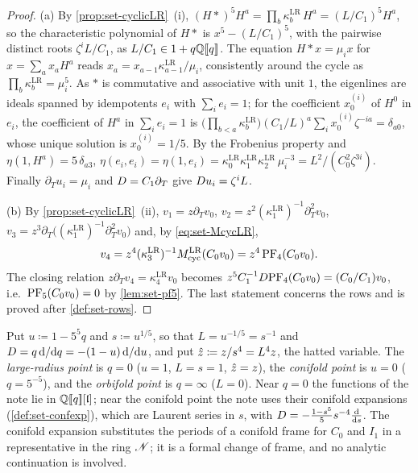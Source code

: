 \begin{proof}
(a) By \cref{prop:set-cyclicLR}~(i), $(H*)^5H^a=\prod_b\kappa^{\mathrm{LR}}_b\,H^a=(L/C_1)^5H^a$, so the characteristic polynomial of $H*$ is $x^5-(L/C_1)^5$, with the pairwise distinct roots $\zeta^iL/C_1$, as $L/C_1\in1+q\mathbb{Q}[\![ q ]\!]$. The equation $H*x=\mu_ix$ for $x=\sum_ax_aH^a$ reads $x_a=x_{a-1}\kappa^{\mathrm{LR}}_{a-1}/\mu_i$, consistently around the cycle as $\prod_b\kappa^{\mathrm{LR}}_b=\mu_i^5$. As $*$ is commutative and associative with unit $1$, the eigenlines are ideals spanned by idempotents $e_i$ with $\sum_ie_i=1$; for the coefficient $x_0^{(i)}$ of $H^0$ in $e_i$, the coefficient of $H^a$ in $\sum_ie_i=1$ is $\bigl(\prod_{b<a}\kappa^{\mathrm{LR}}_b\bigr)(C_1/L)^a\sum_ix_0^{(i)}\zeta^{-ia}=\delta_{a0}$, whose unique solution is $x_0^{(i)}=1/5$. By the Frobenius property and $\eta(1,H^a)=5\,\delta_{a3}$, $\eta(e_i,e_i)=\eta(1,e_i)=\kappa^{\mathrm{LR}}_0\kappa^{\mathrm{LR}}_1\kappa^{\mathrm{LR}}_2\,\mu_i^{-3}=L^2/(C_0^2\zeta^{3i})$. Finally $\partial_Tu_i=\mu_i$ and $D=C_1\partial_T$ give $D u_i=\zeta^iL$.

(b) By \cref{prop:set-cyclicLR}~(ii), $v_1=z\partial_Tv_0$, $v_2=z^2(\kappa^{\mathrm{LR}}_1)^{-1}\partial_T^2v_0$, $v_3=z^3\partial_T\bigl((\kappa^{\mathrm{LR}}_1)^{-1}\partial_T^2v_0\bigr)$ and, by \eqref{eq:set-McycLR},
\[
v_4=z^4(\kappa^{\mathrm{LR}}_3)^{-1}M_{\mathrm{cyc}}^{\mathrm{LR}}(C_0v_0)=z^4\,\mathrm{PF}_{4}(C_0v_0).
\]
The closing relation $z\partial_Tv_4=\kappa^{\mathrm{LR}}_4v_0$ becomes $z^5C_1^{-1}D\mathrm{PF}_{4}(C_0v_0)=(C_0/C_1)v_0$, i.e.\ $\mathrm{PF}_{5}(C_0v_0)=0$ by \cref{lem:set-pf5}. The last statement concerns the rows and is proved after \cref{def:set-rows}.
\end{proof}

\begin{defn}
\label{def:set-points}
Put $u\coloneqq1-5^5q$ and $s\coloneqq u^{1/5}$, so that $L=u^{-1/5}=s^{-1}$ and $D=q\,\mathrm{d}/\mathrm{d} q=-(1-u)\,\mathrm{d}/\mathrm{d} u$, and put $\hat{z}\coloneqq z/s^4=L^4z$, the hatted variable. The \emph{large-radius point} is $q=0$ ($u=1$, $L=s=1$, $\hat{z}=z$), the \emph{conifold point} is $u=0$ ($q=5^{-5}$), and the \emph{orbifold point} is $q=\infty$ ($L=0$). Near $q=0$ the functions of the note lie in $\mathbb{Q}[\![ q ]\!][\mathfrak{l}]$; near the conifold point the note uses their conifold expansions (\cref{def:set-confexp}), which are Laurent series in $s$, with $D=-\frac{1-s^5}5s^{-4}\frac{\mathrm{d}}{\mathrm{d} s}$. The conifold expansion substitutes the periods of a conifold frame for $C_0$ and $I_1$ in a representative in the ring $\mathscr{N}$; it is a formal change of frame, and no analytic continuation is involved.
\end{defn}

